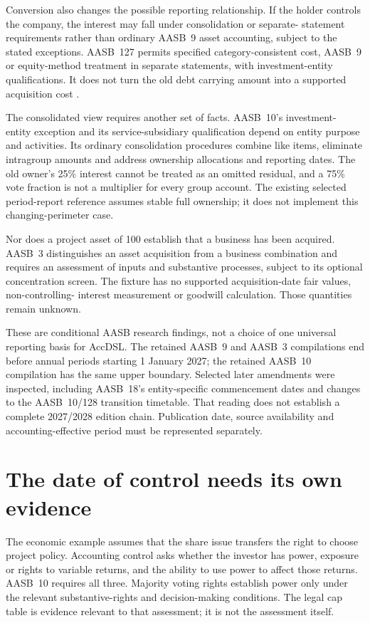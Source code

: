 Conversion also changes the possible reporting relationship. If the holder
controls the company, the interest may fall under consolidation or separate-
statement requirements rather than ordinary AASB~9 asset accounting, subject
to the stated exceptions\citep[paragraph2.1(a),(d)]{aasb9scope2026}. AASB~127
permits specified category-consistent cost, AASB~9 or equity-method treatment
in separate statements, with investment-entity qualifications. It does not
turn the old debt carrying amount into a supported acquisition cost
\citep[paragraphs2--4 and8--11B]{aasb127scope2022}.

The consolidated view requires another set of facts. AASB~10's investment-
entity exception and its service-subsidiary qualification depend on entity
purpose and activities. Its ordinary consolidation procedures combine like
items, eliminate intragroup amounts and address ownership allocations and
reporting dates\citep[paragraphs27--33 and B86--B93]{aasb10scope2026}. The old
owner's 25\% interest cannot be treated as an omitted residual, and a 75\% vote
fraction is not a multiplier for every group account. The existing selected
period-report reference assumes stable full ownership; it does not implement
this changing-perimeter case.

Nor does a project asset of 100 establish that a business has been acquired.
AASB~3 distinguishes an asset acquisition from a business combination and
requires an assessment of inputs and substantive processes, subject to its
optional concentration screen\citep[paragraphs2--10 and B7A--B12D]{aasb3scope2026}.
The fixture has no supported acquisition-date fair values, non-controlling-
interest measurement or goodwill calculation. Those quantities remain unknown.

These are conditional AASB research findings, not a choice of one universal
reporting basis for AccDSL. The retained AASB~9 and AASB~3 compilations end before
annual periods starting 1 January 2027; the retained AASB~10 compilation has the
same upper boundary. Selected later amendments were inspected, including
AASB~18's entity-specific commencement dates and changes to the AASB~10/128
transition timetable. That reading does not establish a complete 2027/2028
edition chain. Publication date, source availability and accounting-effective
period must be represented separately.

\section{The date of control needs its own evidence}
\label{sim:conversion-control-history}
The economic example assumes that the share issue transfers the right to
choose project policy. Accounting control asks whether the investor has power,
exposure or rights to variable returns, and the ability to use power to affect
those returns. AASB~10 requires all three. Majority voting rights establish
power only under the relevant substantive-rights and decision-making
conditions\citep[paragraphs5--14 and B35--B37]{aasb10scope2026}. The legal cap
table is evidence relevant to that assessment; it is not the assessment itself.

